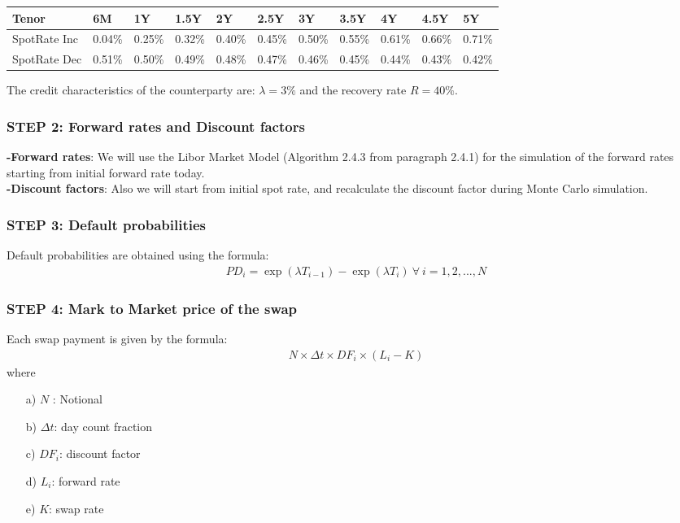 \documentclass[11pt]{article}
\numberwithin{equation}{subsection}
\begin{document}
\vskip 0.2cm 		
{
\begin{center}
\begin{tabular}{lllllllllll}
	\hline
	Tenor & 6M & 1Y & 1.5Y & 2Y & 2.5Y & 3Y &  3.5Y &  4Y &  4.5Y & 5Y \\
	\hline
	SpotRate Inc & 0.04\% & 0.25\% & 0.32\% & 0.40\% & 0.45\% & 0.50\% & 0.55\% & 0.61\% & 0.66\% & 0.71\%  \\
	\hline	
	SpotRate Dec & 0.51\% & 0.50\% & 0.49\% & 0.48\% & 0.47\% & 0.46\% & 0.45\% & 0.44\% & 0.43\% & 0.42\%  \\	
	\hline	
\end{tabular}
\end{center}
}
\vskip 0.2cm
The credit characteristics of the counterparty are:
\(\lambda=3\%\) and the recovery rate \(R=40\%\). 
\subsubsection*{STEP 2: Forward rates and Discount factors}
\textbf{-Forward rates}:  We will use the Libor Market Model (Algorithm 2.4.3 from paragraph 2.4.1) for the simulation of the forward rates starting from initial forward rate today.\\
\textbf{-Discount factors}: Also we will start from initial spot rate, and recalculate the discount factor during Monte Carlo simulation.
\subsubsection*{STEP 3: Default probabilities}
\noindent Default probabilities are obtained using the formula:
\begin{eqnarray*}
	PD_{i}= \exp(\lambda T_{i-1})-\exp(\lambda T_{i}) \ \forall \ i =1,2,...,N
\end{eqnarray*}

\subsubsection*{STEP 4: Mark to Market price of the swap}
Each swap payment is given by the formula:
\begin{eqnarray*}
	N \times \Delta t \times DF_i \times (L_i - K) 
\end{eqnarray*}
where 
\begin{enumerate}
\item [a)] \(N\) : Notional
\item [b)] \(\Delta t\): day count fraction
\item [c)] \(DF_i\): discount factor
\item [d)] \(L_i\): forward rate
\item [e)] \(K\): swap rate 
\end{enumerate}
\end{document}
